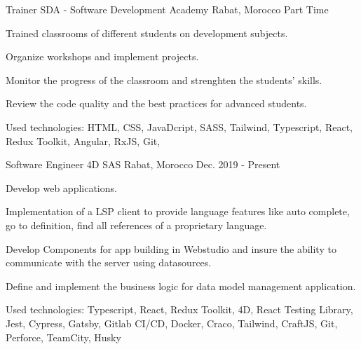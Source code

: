 

\begin{cventries}

  \cventry
    {Trainer} %
    {SDA - Software Development Academy} %
    {Rabat, Morocco} %
    {Part Time} %
    {
      \begin{cvitems} %
        \item {Trained classrooms of different students on development subjects.}
        \item {Organize workshops and implement projects.}
        \item {Monitor the progress of the classroom and strenghten the students' skills.}
        \item {Review the code quality and the best practices for advanced students.}
        \item {Used technologies: HTML, CSS, JavaDcript, SASS, Tailwind, Typescript, React, Redux Toolkit, Angular, RxJS, Git,}
      \end{cvitems}
    }

  \cventry
    {Software Engineer} %
    {4D SAS} %
    {Rabat, Morocco} %
    {Dec. 2019 - Present} %
    {
      \begin{cvitems} %
        \item {Develop web applications.}
        \item {Implementation of a LSP client to provide language features like auto complete, go to definition, find all references of a proprietary language.}
        \item {Develop Components for app building in Webstudio and insure the ability to communicate with the server using datasources.}
        \item {Define and implement the business logic for data model management application.}
        \item {Used technologies: Typescript, React, Redux Toolkit, 4D, React Testing Library, Jest, Cypress, Gatsby, Gitlab CI/CD, Docker, Craco, Tailwind, CraftJS, Git, Perforce, TeamCity, Husky}
      \end{cvitems}
    }


\end{cventries}
